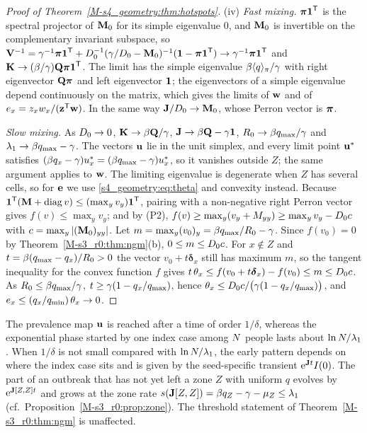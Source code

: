 \begin{proof}[Proof of Theorem~\ref{M-s4_geometry:thm:hotspots}]
  (iv) \emph{Fast mixing.} $\boldsymbol{\pi}\boldsymbol{1}^{\mathsf{T}}$ is the spectral projector of $\mathbf{M}_0$ for its simple eigenvalue $0$,
  and $\mathbf{M}_0$ is invertible on the complementary invariant subspace, so
  $\mathbf{V}^{-1}=\gamma^{-1}\boldsymbol{\pi}\boldsymbol{1}^{\mathsf{T}}+D_0^{-1}(\gamma/D_0-\mathbf{M}_0)^{-1}(\mathbf{1}-\boldsymbol{\pi}\boldsymbol{1}^{\mathsf{T}})\to\gamma^{-1}\boldsymbol{\pi}\boldsymbol{1}^{\mathsf{T}}$
  and $\mathbf{K}\to(\beta/\gamma)\mathbf{Q}\boldsymbol{\pi}\boldsymbol{1}^{\mathsf{T}}$. The limit has the simple eigenvalue $\beta\langle q\rangle_{\pi}/\gamma$ with
  right eigenvector $\mathbf{Q}\boldsymbol{\pi}$ and left eigenvector $\boldsymbol{1}$; the eigenvectors of a simple eigenvalue depend
  continuously on the matrix, which gives the limits of $\mathbf{w}$ and of $e_x=z_xw_x/(\mathbf{z}^{\mathsf{T}}\mathbf{w})$. In the
  same way $\mathbf{J}/D_0\to\mathbf{M}_0$, whose Perron vector is $\boldsymbol{\pi}$.

  \emph{Slow mixing.} As $D_0\to0$, $\mathbf{K}\to\beta\mathbf{Q}/\gamma$, $\mathbf{J}\to\beta\mathbf{Q}-\gamma\mathbf{1}$, $R_0\to\beta q_{\max}/\gamma$ and
  $\lambda_1\to\beta q_{\max}-\gamma$. The vectors $\mathbf{u}$ lie in the unit simplex, and every limit point $\mathbf{u}^*$
  satisfies $(\beta q_x-\gamma)u^*_x=(\beta q_{\max}-\gamma)u^*_x$, so it vanishes outside $Z$; the same argument
  applies to $\mathbf{w}$. The limiting eigenvalue is degenerate when $Z$ has several cells, so for $\mathbf{e}$ we use
  \eqref{s4_geometry:eq:theta} and convexity instead. Because $\boldsymbol{1}^{\mathsf{T}}(\mathbf{M}+\operatorname{diag} v)\le(\max_yv_y)\boldsymbol{1}^{\mathsf{T}}$,
  pairing with a non-negative right Perron vector gives $f(v)\le\max_yv_y$; and by (P2),
  $f(v)\ge\max_y(v_y+M_{yy})\ge\max_yv_y-D_0 c$ with $c=\max_y|(\mathbf{M}_0)_{yy}|$. Let
  $m=\max_y(v_0)_y=\beta q_{\max}/R_0-\gamma$. Since $f(v_0)=0$ by Theorem~\ref{M-s3_r0:thm:ngm}(b), $0\le m\le D_0 c$.
  For $x\notin Z$ and $t=\beta(q_{\max}-q_x)/R_0>0$ the vector $v_0+t\boldsymbol{\delta}_x$ still has maximum $m$,
  so the tangent inequality for the convex function $f$ gives
  $t\,\theta_x\le f(v_0+t\boldsymbol{\delta}_x)-f(v_0)\le m\le D_0 c$. As $R_0\le\beta q_{\max}/\gamma$,
  $t\ge\gamma(1-q_x/q_{\max})$, hence $\theta_x\le D_0 c/\bigl(\gamma(1-q_x/q_{\max})\bigr)$, and
  $e_x\le(q_x/q_{\min})\,\theta_x\to0$.
\end{proof}

\begin{remark}[Transients]\label{s4_geometry:rem:transient}
  The prevalence map $\mathbf{u}$ is reached after a time of order $1/\delta$, whereas the exponential phase started
  by one index case among $N$ people lasts about $\ln N/\lambda_1$. When $1/\delta$ is not small compared
  with $\ln N/\lambda_1$, the early pattern depends on where the index case sits and is given by the
  seed-specific transient $\mathrm{e}^{\mathbf{J} t}I(0)$. The part of an outbreak that has not yet left a zone $Z$ with
  uniform $q$ evolves by $\mathrm{e}^{\mathbf{J}[Z,Z]t}$ and grows at the zone rate
  $s(\mathbf{J}[Z,Z])=\beta q_Z-\gamma-\mu_Z\le\lambda_1$ (cf.\ Proposition~\ref{M-s3_r0:prop:zone}). The threshold
  statement of Theorem~\ref{M-s3_r0:thm:ngm} is unaffected.
\end{remark}

